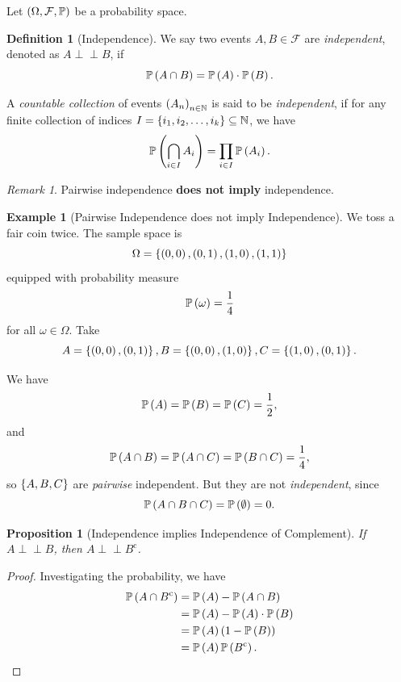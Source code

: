 \documentclass{article}
\newtheorem{proposition}[theorem]{Proposition}
\theoremstyle{definition}
\newtheorem{definition}[theorem]{Definition}
\newtheorem{example}[theorem]{Example}
\theoremstyle{remark}
\newtheorem{remark}[theorem]{Remark}
\newcommand{\NN}{\mathbb{N}}
\newcommand{\Prob}{\mathbb{P}}
\newcommand{\eventSpace}{\mathcal{F}}
\newcommand{\compl}{^{\mathrm{c}}}
\newcommand{\indp}{\mathrel{\perp\!\!\!\perp}}
\begin{document}
Let \(\pqty{\Omega, \eventSpace, \Prob}\) be a probability space.

\begin{definition}[Independence]
    \label{def:independence}%
    We say two events \(A, B \in \eventSpace\) are \emph{independent}, denoted as \(A \indp B\), if
    \[
        \Prob\pqty{A \cap B} = \Prob\pqty{A} \cdot \Prob\pqty{B}.
    \]

    A \emph{countable collection} of events \(\pqty{A_n}_{n \in \NN}\) is said to be \emph{independent}, if for any finite collection of indices \(I = \Bqty{i_1, i_2, \ldots, i_k} \subseteq \NN\), we have
    \[
        \Prob\pqty{\bigcap_{i \in I} A_i} = \prod_{i \in I} \Prob\pqty{A_i}.
    \]
\end{definition}

\begin{remark}
    Pairwise independence \textbf{does not imply} independence.
\end{remark}

\begin{example}[Pairwise Independence does not imply Independence]
    \label{ex:pairwise-indep-does-not-imply-indep}
    We toss a fair coin twice. The sample space is
    \[
        \Omega = \left\{\left(0, 0\right), \left(0, 1\right), \left(1, 0\right), \left(1, 1\right)\right\}
    \]
    equipped with probability measure
    \[
        \Prob\pqty{\omega} = \frac{1}{4}
    \]  
    for all \(\omega \in \Omega\). Take
    \[
        A = \left\{\left(0, 0\right), \left(0, 1\right)\right\}, B = \left\{\left(0, 0\right), \left(1, 0\right)\right\}, C = \left\{\left(1, 0\right), \left(0, 1\right)\right\}.
    \]

    We have
    \[
        \Prob\pqty{A} = \Prob\pqty{B} = \Prob\pqty{C} = \frac{1}{2},
    \]
    and
    \[
        \Prob\pqty{A \cap B} = \Prob\pqty{A \cap C} = \Prob\pqty{B \cap C} = \frac{1}{4},
    \]
    so \(\left\{A, B, C\right\}\) are \emph{pairwise} independent. But they are not \emph{independent}, since
    \[
        \Prob\pqty{A \cap B \cap C} = \Prob\pqty{\emptyset} = 0.
    \]
\end{example}

\begin{proposition}[Independence implies Independence of Complement]
    \label{prop:indep-compl}%
    If \(A \indp B\), then \(A \indp B\compl\).
\end{proposition}

\begin{proof}
    Investigating the probability, we have
    \begin{align*}
        \Prob\pqty{A \cap B\compl} &= \Prob\pqty{A} - \Prob\pqty{A \cap B} \\
        &= \Prob\pqty{A} - \Prob\pqty{A} \cdot \Prob\pqty{B} \\
        &= \Prob\pqty{A} \pqty{1 - \Prob\pqty{B}} \\
        &= \Prob\pqty{A} \Prob\pqty{B\compl}.
    \end{align*}
\end{proof}
\end{document}
